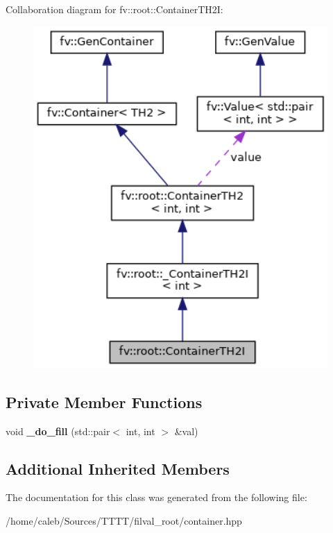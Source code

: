 Collaboration diagram for fv\+:\+:root\+:\+:Container\+T\+H2I\+:
\nopagebreak
\begin{figure}[H]
\begin{center}
\leavevmode
\includegraphics[width=330pt]{classfv_1_1root_1_1ContainerTH2I__coll__graph}
\end{center}
\end{figure}
\subsection*{Private Member Functions}
\begin{DoxyCompactItemize}
\item 
\hypertarget{classfv_1_1root_1_1ContainerTH2I_a3607e20e3088a42b955c211587bba622}{}\label{classfv_1_1root_1_1ContainerTH2I_a3607e20e3088a42b955c211587bba622} 
void {\bfseries \+\_\+do\+\_\+fill} (std\+::pair$<$ int, int $>$ \&val)
\end{DoxyCompactItemize}
\subsection*{Additional Inherited Members}


The documentation for this class was generated from the following file\+:\begin{DoxyCompactItemize}
\item 
/home/caleb/\+Sources/\+T\+T\+T\+T/filval\+\_\+root/container.\+hpp\end{DoxyCompactItemize}
